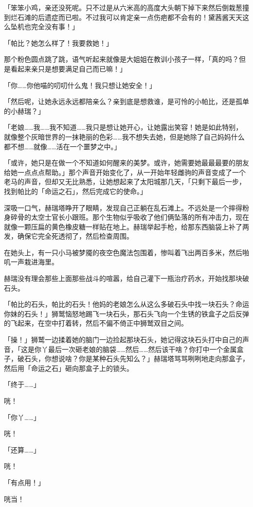 「笨笨小鸡，亲还没死呢。只不过是从六米高的高度大头朝下掉下来然后倒栽葱撞到烂石滩的后遗症而已啦。不过我可以肯定亲一点伤疤都不会有的！黛茜酱天天这么坠机也完全没有事！」

「帕比？她怎么样了！我要救她！」

那个粉色圆点跳了跳，语气听起来就像是大姐姐在教训小孩子一样，「真的吗？但是看起来亲只是想要满足自己而已嘛！」

「你……你他喵的叨叨什么鬼！我只想让她安全！」

「然后呢，让她永远永远都陪亲么？亲到底是想救谁，是可怜的小帕比，还是孤单的小赫瑞？」

「老娘……我……我不知道……我只是想让她开心，让她露出笑容！她是如此特别，就像整个灰暗世界的一抹艳丽的色彩……我不想失去她，但是她除了自己妈妈什么都不想……就像……活在一个噩梦之中。」

「或许，她只是在做一个不知道如何醒来的美梦。或许，她需要她最最最要的朋友给她一点点点帮助。」那个声音开始变化了，从一开始年轻雌驹的声音变成了一个老马的声音，但却又无比熟悉，让她想起来了太阳城那几天，「只剩下最后一步，找到帕比的「命运之石」，然后完成它的使命。」

深吸一口气，赫瑞塔睁开了眼睛，发现自己正躺在乱石滩上。不远处是一个摔得粉身碎骨的太空士官长小跟班。那个生物似乎吸收了他们俩坠落的所有冲击力，现在就像一颗压扁的黄色橡皮糖一样贴在地上。赫瑞举起手枪，给那东西脑袋上补了两发，确保它完全死透彻了，然后检查周围。

在她头上，有一只小马被梦魇的夜空色魔法包围着，惨叫着飞出两百多米，然后啪叽一声栽进海里。

赫瑞没有理会那些上面那些战斗的喧嚣，给自己灌下一瓶治疗药水，开始找那块破石头。

「帕比的石头，帕比的石头！他妈的老娘怎么从这么多破石头中找一块石头？命运你妹的石头！」狮鹫恼怒地踢飞一块石头，那石头飞向一个生锈的铁盒子之后反弹的飞起来，在空中打着转，然后不偏不倚正中狮鹫双目之间。

「操！」狮鹫一边揉着她的脑门一边捡起那块石头，她记得这块石头打中自己的声音，「这是你丫最后一次砸老娘的脑袋……然后……然后该干啥？你打中一个金属盒子，破石头，你想说啥？你是某种石头先知么？」赫瑞塔骂骂咧咧地走向那盒子，然后用「命运之石」砸向那盒子上的锁头。

「终于……」

咣！

「你丫……」

咣！

「还算……」

咣！

「有点用！」

咣当！

